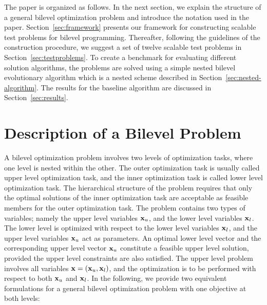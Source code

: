 \documentclass[twoside]{article}
\begin{document}
The paper is organized as follows. In the next section, we explain the structure of a general bilevel optimization problem and introduce the notation used in the paper. Section~\ref{sec:framework} presents our framework for constructing scalable test problems for bilevel programming. Thereafter, following the guidelines of the construction procedure, we suggest a set of twelve scalable test problems in Section~\ref{sec:testproblems}. To create a benchmark for evaluating different solution algorithms, the problems are solved using a simple nested bilevel evolutionary algorithm which is a nested scheme described in Section~\ref{sec:nested-algorithm}. The results for the baseline algorithm are discussed in Section~\ref{sec:results}.

\section{Description of a Bilevel Problem}
A bilevel optimization problem involves two levels of optimization tasks, where one level is nested within the other. The outer optimization task is usually called upper level optimization task, and the inner optimization task is called lower level optimization task. The hierarchical structure of the problem requires that only the optimal solutions of the inner optimization task are acceptable as feasible members for the outer optimization task. The problem contains two types of variables; namely the upper level variables $\mbox{$\mathbf{x}$}_u$, and the lower level variables $\mbox{$\mathbf{x}$}_l$. The lower level is optimized with respect to the lower level variables $\mbox{$\mathbf{x}$}_l$, and the upper level variables $\mbox{$\mathbf{x}$}_u$ act as parameters. An optimal lower level vector and the corresponding upper level vector $\mbox{$\mathbf{x}$}_u$ constitute a feasible upper level solution, provided the upper level constraints are also satisfied. The upper level problem involves  all variables $\mbox{$\mathbf{x}$}=(\mbox{$\mathbf{x}$}_u,\mbox{$\mathbf{x}$}_l)$, and the optimization is to be performed with respect to both $\mbox{$\mathbf{x}$}_u$ and $\mbox{$\mathbf{x}$}_l$. In the following, we provide two equivalent formulations for a general bilevel optimization problem with one objective at both levels:
\end{document}
